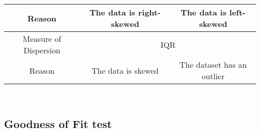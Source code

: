 \begin{table}[H]
\begin{adjustbox}{width = \textwidth, center}
\begin{tabular}{|c|rrrrrr|}
            \rowcolor[HTML]{F4CCCC} 
            Reason                                                                       & \multicolumn{4}{c|}{\cellcolor[HTML]{F4CCCC}The data is right-skewed}                                                                                                                                                                                                                        & \multicolumn{2}{c|}{\cellcolor[HTML]{F4CCCC}The data is left-skewed}                                                       \\ \hline
            \rowcolor[HTML]{FCE5CD} 
            Measure of Dispersion                                                         & \multicolumn{6}{c|}{\cellcolor[HTML]{FCE5CD}IQR}                                                                                                                                                                                                                                                                                                                                                                          \\ \hline
            \rowcolor[HTML]{FCE5CD} 
            Reason                                                                       & \multicolumn{1}{c|}{\cellcolor[HTML]{FCE5CD}The data is skewed} & \multicolumn{5}{c|}{\cellcolor[HTML]{FCE5CD}The dataset has an outlier}                                                                                                                                                                                                                                                                                 \\ \hline
            \end{tabular}
    \end{adjustbox}
\end{table}\\
\subsection*{Goodness of Fit test}

